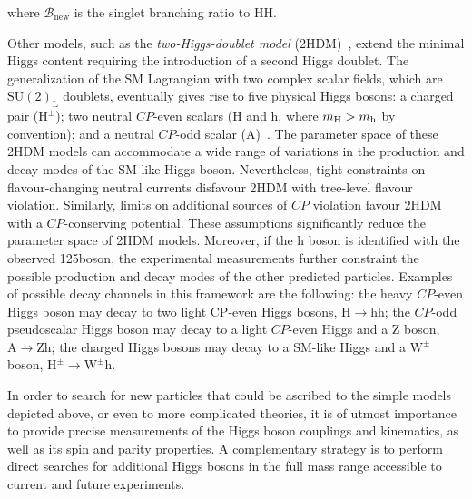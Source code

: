 \noindent where $\mathcal{B}_\mathrm{new}$ is the singlet branching ratio to HH.

Other models, such as the \emph{two-Higgs-doublet model} (2HDM)~\cite{Branco:2011iw}, extend the minimal Higgs content requiring the introduction of a second Higgs doublet. 
The generalization of the SM Lagrangian with two complex scalar fields, which are $\mathrm{SU(2)_L}$ doublets, eventually gives rise to five physical Higgs bosons: a charged pair ($\mathrm{H^{\pm}}$); two neutral $CP$-even scalars (H and h, where $m_{\rm H}>m_{\rm h}$ by convention); and a neutral $CP$-odd scalar (A)~\cite{Craig:2013hca}. The parameter space of these 2HDM models can accommodate a wide range of variations in the production and decay modes of the SM-like Higgs boson. Nevertheless, tight constraints on flavour-changing neutral currents disfavour 2HDM with tree-level flavour violation. Similarly, limits on additional sources of $CP$ violation favour 2HDM with a $CP$-conserving potential. These assumptions significantly reduce the parameter space of 2HDM models. Moreover, if the h boson is identified with the observed 125\GeV boson, the experimental measurements further constraint the possible production and decay modes of the other predicted particles. Examples of possible decay channels in this framework are the following: the  heavy  $CP$-even  Higgs boson  may  decay  to  two  light  CP-even  Higgs bosons, $\mathrm{H \to hh}$; the $CP$-odd pseudoscalar Higgs boson may decay to a light $CP$-even Higgs and a Z boson, $\mathrm{A \to Zh}$; the charged Higgs bosons may decay to a SM-like Higgs and a $\mathrm{W}^\pm$ boson, $\mathrm{H^\pm \to \mathrm{W}^\pm h}$.

In order to search for new particles that could be ascribed to the simple models depicted above, or even to more complicated theories, it is of utmost importance to provide precise measurements of the Higgs boson couplings and kinematics, as well as its spin and parity properties. A complementary strategy is to perform direct searches for additional Higgs bosons in the full mass range accessible to current and future experiments.
